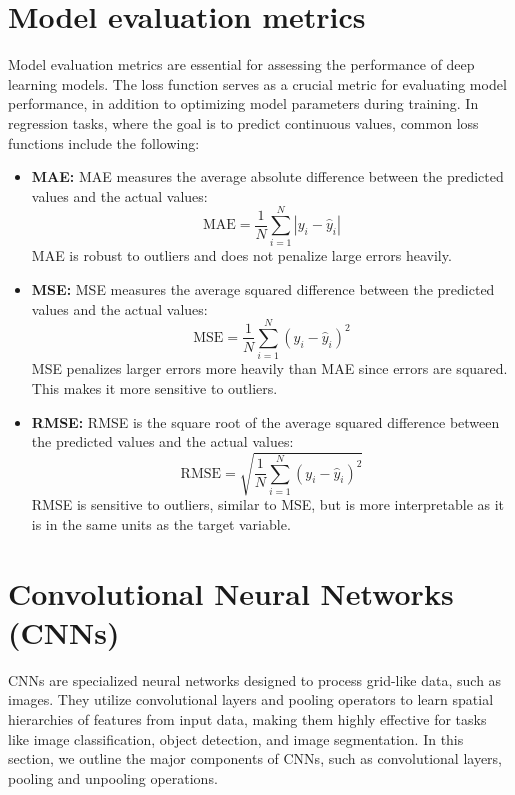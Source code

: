 \section{Model evaluation metrics}
Model evaluation metrics are essential for assessing the performance of deep learning models. The loss function serves as a crucial metric for evaluating model performance, in addition to optimizing model parameters during training. In regression tasks, where the goal is to predict continuous values, common loss functions include the following:
\begin{itemize}
\item \textbf{\gls{MAE}:} MAE measures the average absolute difference between the predicted values and the actual values:\[ \text{MAE} = \frac{1}{N} \sum_{i=1}^{N} |y_i - \hat{y}_i| \]  MAE is robust to outliers and does not penalize large errors heavily.
\item \textbf{\gls{MSE}:} MSE measures the average squared difference between the predicted values and the actual values:\[ \text{MSE} = \frac{1}{N} \sum_{i=1}^{N} (y_i - \hat{y}_i)^2 \] MSE penalizes larger errors more heavily than MAE since errors are squared. This makes it more sensitive to outliers. 
\item \textbf{\gls{RMSE}:} RMSE is the square root of the average squared difference between the predicted values and the actual values: \[ \text{RMSE} = \sqrt{\frac{1}{N} \sum_{i=1}^{N} (y_i - \hat{y}_i)^2} \]RMSE is sensitive to outliers, similar to MSE, but is more interpretable as it is in the same units as the target variable.
\end{itemize}
\section{Convolutional Neural Networks (CNNs)} \label{cnnse}
CNNs \cite{lecun1998} are specialized neural networks designed to process grid-like data, such as images. They utilize convolutional layers and pooling operators to learn spatial hierarchies of features from input data, making them highly effective for tasks like image classification, object detection, and image segmentation. In this section, we outline the major components of CNNs, such as convolutional layers, pooling and unpooling operations. 
